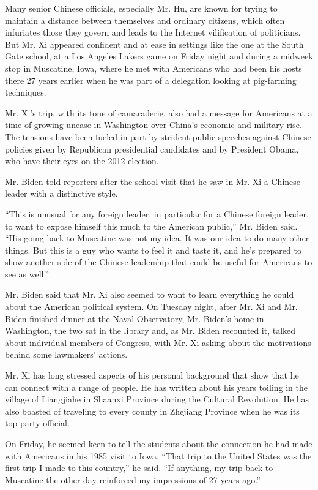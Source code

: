 Many senior Chinese officials, especially Mr. Hu, are known for trying
to maintain a distance between themselves and ordinary citizens, which
often infuriates those they govern and leads to the Internet
vilification of politicians. But Mr. Xi appeared confident and at ease
in settings like the one at the South Gate school, at a Los Angeles
Lakers game on Friday night and during a midweek stop in Muscatine,
Iowa, where he met with Americans who had been his hosts there 27 years
earlier when he was part of a delegation looking at pig-farming
techniques.

Mr. Xi's trip, with its tone of camaraderie, also had a message for
Americans at a time of growing unease in Washington over China's
economic and military rise. The tensions have been fueled in part by
strident public speeches against Chinese policies given by Republican
presidential candidates and by President Obama, who have their eyes on
the 2012 election.

Mr. Biden told reporters after the school visit that he saw in Mr. Xi a
Chinese leader with a distinctive style.

``This is unusual for any foreign leader, in particular for a Chinese
foreign leader, to want to expose himself this much to the American
public,'' Mr. Biden said. ``His going back to Muscatine was not my idea.
It was our idea to do many other things. But this is a guy who wants to
feel it and taste it, and he's prepared to show another side of the
Chinese leadership that could be useful for Americans to see as well.''

Mr. Biden said that Mr. Xi also seemed to want to learn everything he
could about the American political system. On Tuesday night, after Mr.
Xi and Mr. Biden finished dinner at the Naval Observatory, Mr. Biden's
home in Washington, the two sat in the library and, as Mr. Biden
recounted it, talked about individual members of Congress, with Mr. Xi
asking about the motivations behind some lawmakers' actions.

Mr. Xi has long stressed aspects of his personal background that show
that he can connect with a range of people. He has written about his
years toiling in the village of Liangjiahe in Shaanxi Province during
the Cultural Revolution. He has also boasted of traveling to every
county in Zhejiang Province when he was its top party official.

On Friday, he seemed keen to tell the students about the connection he
had made with Americans in his 1985 visit to Iowa. ``That trip to the
United States was the first trip I made to this country,'' he said. ``If
anything, my trip back to Muscatine the other day reinforced my
impressions of 27 years ago.''

